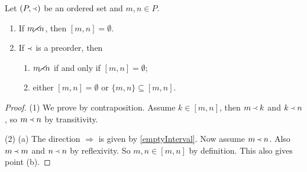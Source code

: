 \begin{lemma} \label{emptyInterval}
Let $(P,\Yleft)$ be an ordered set and $m,n\in P$.
\begin{enumerate}
\item If $m \cancel\Yleft n$, then $[m,n] = \emptyset$.
\item If $\Yleft$ is a preorder, then
\begin{enumerate}
\item $m \cancel\Yleft n$ \textup{if and only if} $[m,n] = \emptyset$;
\item either $[m,n] = \emptyset$ or $\{m,n\} \subseteq [m,n]$.
\end{enumerate}
\end{enumerate}
\end{lemma}
\begin{proof}
(1) We prove by contraposition. Assume $k\in [m,n]$, then $m\Yleft k$ and $k\Yleft n$, so $m\Yleft n$ by transitivity.

(2) (a) The direction $\Rightarrow$ is given by \ref{emptyInterval}. Now assume $m \Yleft n$. Also $m\Yleft m$ and $n \Yleft n$ by reflexivity. So $m,n\in [m,n]$ by definition. This also gives point (b).
\end{proof}


